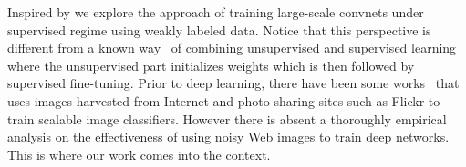 \documentclass[preprint,12pt]{elsarticle}
\begin{document}

Inspired by \cite{DBLP:conf/nips/DosovitskiySRB14} we explore the approach of training large-scale convnets under supervised regime using weakly labeled data. Notice that this perspective is different from a known way~\cite{DBLP:journals/neco/HintonOT06} of combining unsupervised and supervised learning where the unsupervised part initializes weights which is then followed by supervised fine-tuning. Prior to deep learning, there have been some works~\cite{DBLP:journals/tmm/UlgesWB11,DBLP:journals/pami/WangHF12} that uses images harvested from Internet and photo sharing sites such as Flickr to train scalable image classifiers. However there is absent a thoroughly empirical analysis on the effectiveness of using noisy Web images to train deep networks. This is where our work comes into the context. 
\end{document}
